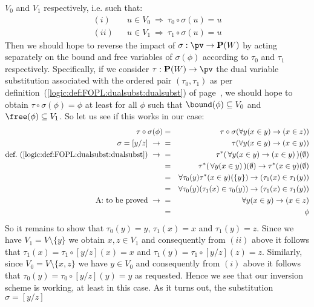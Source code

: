$V_{0}$ and $V_{1}$ respectively, i.e. such that:
    \begin{eqnarray*}
    (i)&&u\in V_{0}\ \Rightarrow\ \tau_{0}\circ\sigma(u)=u\\
    (ii)&&u\in V_{1}\ \Rightarrow\ \tau_{1}\circ\sigma(u)=u
    \end{eqnarray*}
Then we should hope to reverse the impact of $\sigma:\pv\to{\bf
P}(W)$ by acting separately on the bound and free variables of
$\sigma(\phi)$ according to $\tau_{0}$ and $\tau_{1}$ respectively.
Specifically, if we consider $\tau:{\bf P}(W)\to\pv$ the dual
variable substitution associated with the ordered pair
$(\tau_{0},\tau_{1})$ as per
definition~(\ref{logic:def:FOPL:dualsubst:dualsubst}) of
page~\pageref{logic:def:FOPL:dualsubst:dualsubst}, we should hope to
obtain $\tau\circ\sigma(\phi)=\phi$ at least for all $\phi$ such
that $\bound(\phi)\subseteq V_{0}$ and $\free(\phi)\subseteq V_{1}$.
So let us see if this works in our case:
    \begin{eqnarray*}\tau\circ\sigma(\phi)
        &=&\tau\circ\sigma(\forall y(x\in y)\to(x\in z))\\
        \sigma=[y/z]\ \to\ 
        &=&\tau(\forall y(x\in y)\to(x\in y))\\
        \mbox{def.~(\ref{logic:def:FOPL:dualsubst:dualsubst})}\ \to\ 
        &=&\tau^{*}(\,\forall y(x\in y)\to(x\in y)\,)(\emptyset)\\
        &=&\tau^{*}(\,\forall y(x\in y)\,)(\emptyset)\to
           \tau^{*}(x\in y)(\emptyset)\\
        &=&\forall \tau_{0}(y)\tau^{*}(x\in y)(\{y\})\to
           (\tau_{1}(x)\in\tau_{1}(y))\\
        &=&\forall\tau_{0}(y)(\tau_{1}(x)\in \tau_{0}(y))\to
        (\tau_{1}(x)\in\tau_{1}(y))\\
        \mbox{A: to be proved}\ \to\ &=&\forall y(x\in y)\to(x\in z)\\
        &=&\phi
    \end{eqnarray*}
So it remains to show that $\tau_{0}(y)=y$, $\tau_{1}(x)=x$ and
$\tau_{1}(y)=z$. Since we have $V_{1}=V\setminus\{y\}$ we obtain
$x,z\in V_{1}$ and consequently from $(ii)$ above it follows that
$\tau_{1}(x)=\tau_{1}\circ[y/z](x)=x$ and
$\tau_{1}(y)=\tau_{1}\circ[y/z](z)=z$. Similarly, since
$V_{0}=V\setminus\{x,z\}$ we have $y\in V_{0}$ and consequently from
$(i)$ above it follows that $\tau_{0}(y)=\tau_{0}\circ[y/z](y)=y$
as requested. Hence we see that our inversion scheme is working, at
least in this case. As it turns out, the substitution $\sigma=[y/z]$
